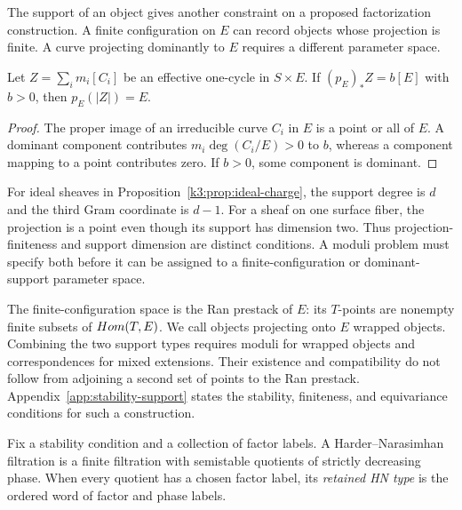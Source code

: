 The support of an object gives another constraint on a proposed
factorization construction.  A finite configuration on $E$ can
record objects whose projection is finite.  A curve projecting
dominantly to $E$ requires a different parameter space.

\begin{lemma}
\label{lem:projection-locality-obstruction}
Let $Z=\sum_i m_i[C_i]$ be an effective one-cycle in $S\times E$.
If $(p_E)_*Z=b[E]$ with $b>0$, then $p_E(|Z|)=E$.
\end{lemma}

\begin{proof}
The proper image of an irreducible curve $C_i$ in $E$ is a point or
all of $E$.  A dominant component contributes
$m_i\deg(C_i/E)>0$ to $b$, whereas a component mapping to a point
contributes zero.  If $b>0$, some component is dominant.
\end{proof}

\begin{remark}
\label{rem:geometric-vs-borcherds-degree}
For ideal sheaves in Proposition~\ref{k3:prop:ideal-charge}, the
support degree is $d$ and the third Gram coordinate is $d-1$.
For a sheaf on one surface fiber, the projection is a point even
though its support has dimension two.  Thus projection-finiteness
and support dimension are distinct conditions.  A moduli problem
must specify both before it can be assigned to a finite-configuration
or dominant-support parameter space.
\end{remark}

The finite-configuration space is the Ran prestack of $E$: its
$T$-points are nonempty finite subsets of $Hom(T,E)$.  We call
objects projecting onto $E$ wrapped objects.  Combining the two
support types requires moduli for wrapped objects and correspondences
for mixed extensions.  Their existence and compatibility do not
follow from adjoining a second set of points to the Ran prestack.
Appendix~\ref{app:stability-support} states the stability, finiteness,
and equivariance conditions for such a construction.

\begin{definition}
\label{k3:def:hn-type}
Fix a stability condition and a collection of factor labels.
A Harder--Narasimhan filtration is a finite filtration with semistable
quotients of strictly decreasing phase.  When every quotient has a chosen factor label, its
\emph{retained HN type} is the ordered word of factor and phase labels.
\end{definition}

